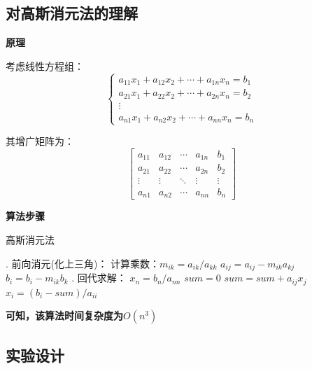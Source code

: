 \documentclass{nku}
\begin{document}
\subsection{对高斯消元法的理解}
\textbf{原理}

考虑线性方程组：
\begin{equation}
    \begin{cases}
    a_{11}x_1 + a_{12}x_2 + \cdots + a_{1n}x_n = b_1 \\
    a_{21}x_1 + a_{22}x_2 + \cdots + a_{2n}x_n = b_2 \\
    \vdots \\
    a_{n1}x_1 + a_{n2}x_2 + \cdots + a_{nn}x_n = b_n
    \end{cases}
\end{equation}

其增广矩阵为：
\begin{equation}
    \left[
    \begin{array}{cccc|c}
    a_{11} & a_{12} & \cdots & a_{1n} & b_1 \\
    a_{21} & a_{22} & \cdots & a_{2n} & b_2 \\
    \vdots & \vdots & \ddots & \vdots & \vdots \\
    a_{n1} & a_{n2} & \cdots & a_{nn} & b_n
    \end{array}
    \right]
\end{equation}

\textbf{算法步骤}
\begin{algorithm}[H]
    \caption{高斯消元法}
    \label{alg:gaussian-elimination}
    \begin{algorithmic}
    . 前向消元(化上三角)：
            \STATE 计算乘数：$m_{ik} = a_{ik}/a_{kk}$
                \STATE $a_{ij} = a_{ij} - m_{ik}a_{kj}$
            \ENDFOR
            \STATE $b_i = b_i - m_{ik}b_k$
        \ENDFOR
    \ENDFOR
    . 回代求解：
    \STATE $x_n = b_n/a_{nn}$
        \STATE $sum = 0$
            \STATE $sum = sum + a_{ij}x_j$
        \ENDFOR
        \STATE $x_i = (b_i - sum)/a_{ii}$
    \ENDFOR
    \end{algorithmic}
\end{algorithm}

\textbf{可知，该算法时间复杂度为$O(n^3)$}

\subsection{实验设计}
\end{document}
